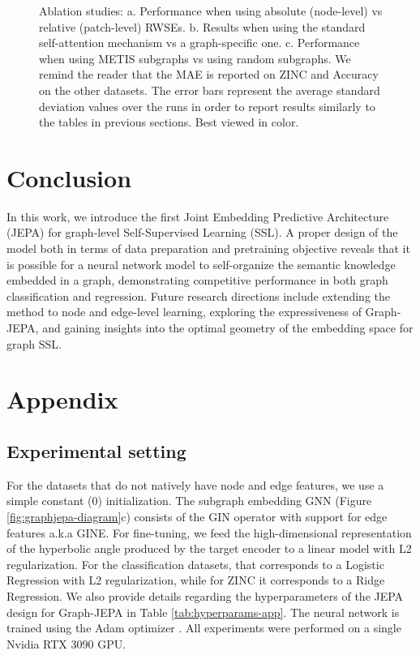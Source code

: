 \documentclass{article} \usepackage{iclr2024_conference,times}
\begin{document}
\begin{figure}
    \centering
    \caption{Ablation studies: a. Performance when using absolute (node-level) vs relative (patch-level) RWSEs. b. Results when using the standard self-attention mechanism vs a graph-specific one. c. Performance when using METIS subgraphs vs using random subgraphs. We remind the reader that the MAE is reported on ZINC and Accuracy on the other datasets. The error bars represent the average standard deviation values over the runs in order to report results similarly to the tables in previous sections. Best viewed in color.} 
    \label{fig:ablations}
\end{figure}


\section{Conclusion}
In this work, we introduce the first Joint Embedding Predictive Architecture (JEPA) for graph-level Self-Supervised Learning (SSL). A proper design of the model both in terms of data preparation and pretraining objective reveals that it is possible for a neural network model to self-organize the semantic knowledge embedded in a graph, demonstrating competitive performance in both graph classification and regression. Future research directions include extending the method to node and edge-level learning, exploring the expressiveness of Graph-JEPA, and gaining insights into the optimal geometry of the embedding space for graph SSL.






\appendix
\section{Appendix}
\subsection{Experimental setting} \label{app:exp-setting}
For the datasets that do not natively have node and edge features, we use a simple constant (0) initialization. The subgraph embedding GNN (Figure \ref{fig:graphjepa-diagram}c) consists of the GIN operator with support for edge features \citep{hu2019strategies} a.k.a GINE. For fine-tuning, we feed the high-dimensional representation of the hyperbolic angle produced by the target encoder to a linear model with L2 regularization. For the classification datasets, that corresponds to a Logistic Regression with L2 regularization, while for ZINC it corresponds to a Ridge Regression. We also provide details regarding the hyperparameters of the JEPA design for Graph-JEPA in Table \ref{tab:hyperparams-app}. The neural network is trained using the Adam optimizer \citep{kingma2014adam}. All experiments were performed on a single Nvidia RTX 3090 GPU.
\end{document}
